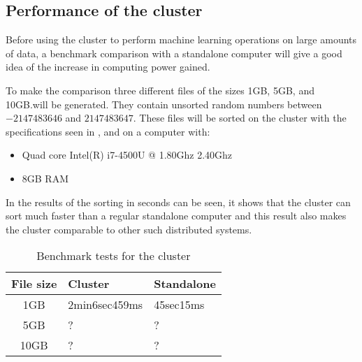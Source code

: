 \subsection{Performance of the cluster}\label{sec:benchmark}
Before using the cluster to perform machine learning operations on large amounts of data, a benchmark comparison with a standalone computer will give a good idea of the increase in computing power gained.

To make the comparison three different files of the sizes 1GB, 5GB, and 10GB.\@ will be generated. They contain unsorted random numbers between $-2147483646$ and $2147483647$. These files will be sorted on the cluster with the specifications seen in , and on a computer with:
\begin{itemize}
\item Quad core Intel(R) i7-4500U @ 1.80Ghz 2.40Ghz
\item 8GB RAM
\end{itemize}

In  the results of the sorting in seconds can be seen, it shows that the cluster can sort much faster than a regular standalone computer and this result also makes the cluster comparable to other such distributed systems.

\begin{table}[!htb]
  \centering
  \begin{tabular}{|c|ll|}
    \hline
    File size & Cluster  & Standalone \\
    \hline
    1GB & 2min6sec459ms & 45sec15ms \\
    5GB & ? & ? \\
    10GB & ? & ? \\
    \hline
  \end{tabular}
  \caption{Benchmark tests for the cluster}
  \label{tab:bench}
\end{table}





